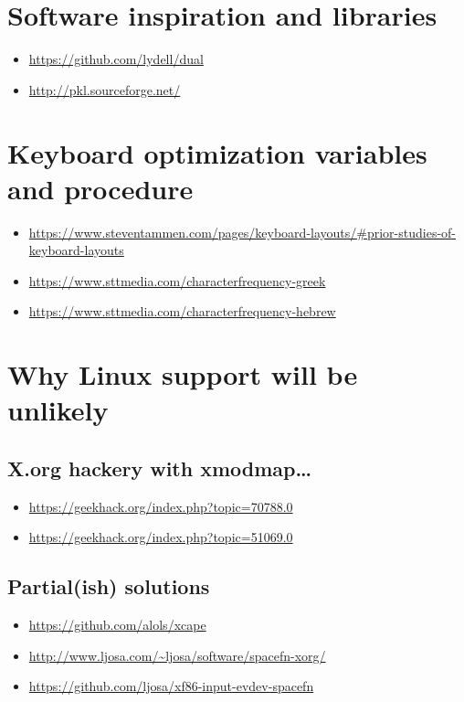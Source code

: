 \documentclass[11pt]{article}
\begin{document}
\section{Software inspiration and libraries}
\label{sec:orgcd26d67}

\begin{itemize}
\item \url{https://github.com/lydell/dual}
\item \url{http://pkl.sourceforge.net/}
\end{itemize}

\section{Keyboard optimization variables and procedure}
\label{sec:orgdd1e488}

\begin{itemize}
\item \url{https://www.steventammen.com/pages/keyboard-layouts/\#prior-studies-of-keyboard-layouts}
\item \url{https://www.sttmedia.com/characterfrequency-greek}
\item \url{https://www.sttmedia.com/characterfrequency-hebrew}
\end{itemize}

\section{Why Linux support will be unlikely}
\label{sec:org8d6fce0}

\subsection{X.org hackery with xmodmap\ldots{}}
\label{sec:orgad8186b}

\begin{itemize}
\item \url{https://geekhack.org/index.php?topic=70788.0}
\item \url{https://geekhack.org/index.php?topic=51069.0}
\end{itemize}

\subsection{Partial(ish) solutions}
\label{sec:org07dde8c}

\begin{itemize}
\item \url{https://github.com/alols/xcape}
\item \url{http://www.ljosa.com/\~ljosa/software/spacefn-xorg/}
\item \url{https://github.com/ljosa/xf86-input-evdev-spacefn}
\end{itemize}
\end{document}
